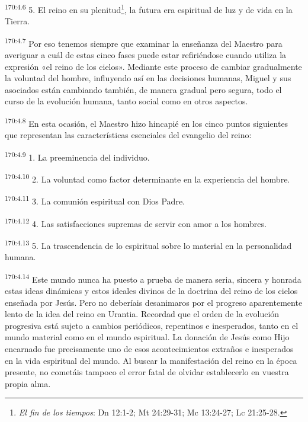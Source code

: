 \par
\textsuperscript{170:4.6} 5. El reino en su plenitud\footnote{\textit{El fin de los tiempos}: Dn 12:1-2; Mt 24:29-31; Mc 13:24-27; Lc 21:25-28.}, la futura era espiritual de luz y de vida en la Tierra.

\par
\textsuperscript{170:4.7} Por eso tenemos siempre que examinar la enseñanza del Maestro para averiguar a cuál de estas cinco fases puede estar refiriéndose cuando utiliza la expresión «el reino de los cielos». Mediante este proceso de cambiar gradualmente la voluntad del hombre, influyendo así en las decisiones humanas, Miguel y sus asociados están cambiando también, de manera gradual pero segura, todo el curso de la evolución humana, tanto social como en otros aspectos.

\par
\textsuperscript{170:4.8} En esta ocasión, el Maestro hizo hincapié en los cinco puntos siguientes que representan las características esenciales del evangelio del reino:

\par
\textsuperscript{170:4.9} 1. La preeminencia del individuo.

\par
\textsuperscript{170:4.10} 2. La voluntad como factor determinante en la experiencia del hombre.

\par
\textsuperscript{170:4.11} 3. La comunión espiritual con Dios Padre.

\par
\textsuperscript{170:4.12} 4. Las satisfacciones supremas de servir con amor a los hombres.

\par
\textsuperscript{170:4.13} 5. La trascendencia de lo espiritual sobre lo material en la personalidad humana.

\par
\textsuperscript{170:4.14} Este mundo nunca ha puesto a prueba de manera seria, sincera y honrada estas ideas dinámicas y estos ideales divinos de la doctrina del reino de los cielos enseñada por Jesús. Pero no deberíais desanimaros por el progreso aparentemente lento de la idea del reino en Urantia. Recordad que el orden de la evolución progresiva está sujeto a cambios periódicos, repentinos e inesperados, tanto en el mundo material como en el mundo espiritual. La donación de Jesús como Hijo encarnado fue precisamente uno de esos acontecimientos extraños e inesperados en la vida espiritual del mundo. Al buscar la manifestación del reino en la época presente, no cometáis tampoco el error fatal de olvidar establecerlo en vuestra propia alma.

